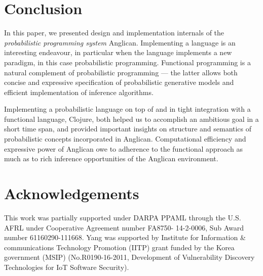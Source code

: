 \documentclass[sigconf]{acmart}
\begin{document}
\section{Conclusion}
\label{seq:summary}

In this paper, we presented design and implementation internals
of the \emph{probabilistic programming system} Anglican. Implementing
a language is an interesting endeavour, in particular when the
language implements a new paradigm, in this case probabilistic
programming. Functional programming is a natural complement of
probabilistic programming --- the latter allows both concise and
expressive specification of probabilistic generative models and
efficient implementation of inference algorithms.

Implementing a probabilistic language on top of and in tight
integration with a functional language, Clojure, both helped
us to accomplish an ambitious goal in a short time span, and
provided important insights on structure and semantics of
probabilistic concepts incorporated in Anglican. Computational
efficiency and expressive power of Anglican owe to adherence to
the functional approach as much as to rich inference
opportunities of the Anglican environment.

\section*{Acknowledgements}

This work was partially supported under DARPA PPAML through the
U.S. AFRL under Cooperative Agreement number FA8750- 14-2-0006,
Sub Award number 61160290-111668. Yang was supported by Institute for 
Information \& communications Technology Promotion (IITP) grant funded 
by the Korea government (MSIP) (No.R0190-16-2011, Development of 
Vulnerability Discovery Technologies for IoT Software Security).



\end{document}
